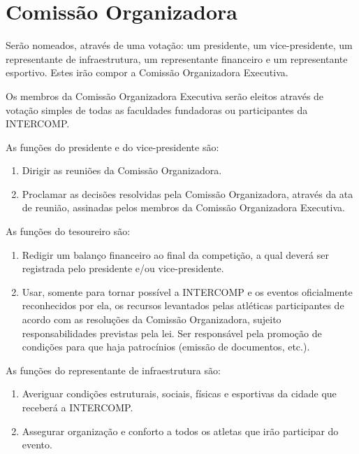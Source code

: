 {\let\clearpage\relax \chapter{Comissão Organizadora}}

\begin{article}
	Serão nomeados, através de uma votação: um presidente, um vice-presidente, um representante de infraestrutura, um representante financeiro e um representante esportivo. Estes irão compor a Comissão Organizadora Executiva.
\end{article}

\begin{article}
	Os membros da Comissão Organizadora Executiva serão eleitos através de votação simples de todas as faculdades fundadoras ou participantes da INTERCOMP.

	\begin{xparagraph}
		As funções do presidente e do vice-presidente são:
		\begin{enumerate}[noitemsep]
			\item Dirigir as reuniões da Comissão Organizadora.
			\item Proclamar as decisões resolvidas pela Comissão Organizadora, através da ata de reunião, assinadas pelos membros da Comissão Organizadora Executiva.
		\end{enumerate}
	\end{xparagraph}

	\begin{xparagraph}
		As funções do tesoureiro são:
		\begin{enumerate}[noitemsep]
			\item Redigir um balanço financeiro ao final da competição, a qual deverá ser registrada pelo presidente e/ou vice-presidente.
			\item Usar, somente para tornar possível a INTERCOMP e os eventos oficialmente reconhecidos por ela, os recursos levantados pelas atléticas participantes de acordo com as resoluções da Comissão Organizadora, sujeito responsabilidades previstas pela lei. Ser responsável pela promoção de condições para que haja patrocínios (emissão de documentos, etc.).
		\end{enumerate}
	\end{xparagraph}

	\begin{xparagraph}
		As funções do representante de infraestrutura são:
		\begin{enumerate}[noitemsep]
			\item Averiguar condições estruturais, sociais, físicas e esportivas da cidade que receberá a INTERCOMP.
			\item Assegurar organização e conforto a todos os atletas que irão participar do evento.
		\end{enumerate}
	\end{xparagraph}


\end{article}
